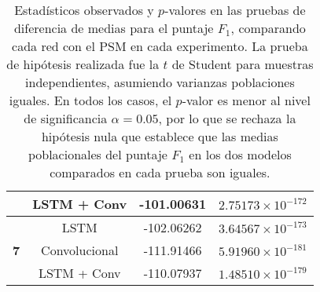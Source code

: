 \documentclass[../main.tex]{subfiles}
\begin{document}
\begin{table}[H]
\begin{tabular}{|c|c|c|c|}
        & LSTM + Conv      & -101.00631 & \( 2.75173 \times 10^{-172} \) \\
        \hline
        \multirow{3}{*}{\textbf{7}}
        & LSTM             & -102.06262 & \( 3.64567 \times 10^{-173} \) \\
        & Convolucional    & -111.91466 & \( 5.91960 \times 10^{-181} \) \\
        & LSTM + Conv      & -110.07937 & \( 1.48510 \times 10^{-179} \) \\
        \hline
    \end{tabular}
    \caption{Estadísticos observados y \(p\)-valores en las pruebas de diferencia de
    medias para el puntaje \(F_1\), comparando cada red con el PSM en cada experimento.
    La prueba de hipótesis realizada fue la \(t\) de Student para muestras independientes,
    asumiendo varianzas poblaciones iguales. En todos los casos, el \(p\)-valor es menor
    al nivel de significancia \(\alpha = 0.05\), por lo que se rechaza la hipótesis nula
    que establece que las medias poblacionales del puntaje \(F_1\) en los dos modelos comparados
    en cada prueba son iguales.}
    \label{tab:pruebas_hipotesis}
\end{table}
\end{document}
